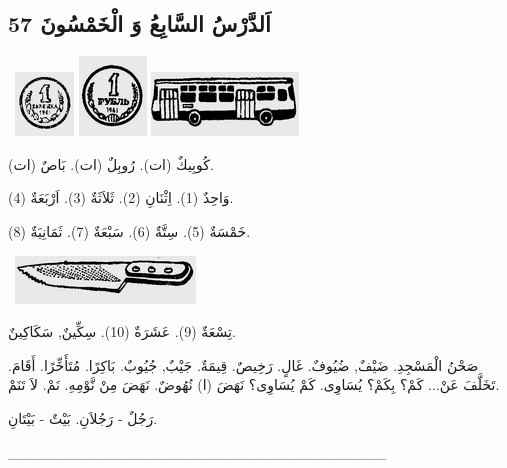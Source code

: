 \documentclass[a5paper]{article}
\begin{document}
\subsection{اَلدَّرْسُ السَّابِعُ وَ الْخَمْسُونَ 57 }
\  \includegraphics[width=0.6146in,height=0.6665in]{images/MuhammadBagauddinprettified-img186.png}   \includegraphics[width=0.7083in,height=0.8335in]{images/MuhammadBagauddinprettified-img187.png}   \includegraphics[width=1.5417in,height=0.6665in]{images/MuhammadBagauddinprettified-img188.png} 

كُوبِيكٌ (ات). رُوبِلٌ (ات). بَاصٌ (ات). 

وَاحِدٌ (1). اِثْنَانِ (2). ثَلاَثَةٌ (3). اَرْبَعَةٌ (4). 

خَمْسَةٌ (5). سِتَّةٌ (6). سَبْعَةٌ (7). ثَمَانِيَةٌ (8). 

\  \includegraphics[width=1.8854in,height=0.5in]{images/MuhammadBagauddinprettified-img189.png} 

تِسْعَةٌ (9). عَشَرَةٌ (10). سِكِّينٌ, سَكَاكِينٌ. 

صَحْنُ الْمَسْجِدِ. ضَيْفٌ, ضُيُوفٌ. غَالٍ. رَخِيصٌ. قِيمَةٌ. جَيْبٌ, جُيُوبٌ. بَاكِرًا. مُتَأَخِّرًا. أَقَامَ. تَخَلَّفَ عَنْ... كَمْ؟ بِكَمْ؟ يُسَاوِى. كَمْ يُسَاوِى؟ نَهَضَ (ا) نُهُوضٌ. نَهَضَ مِنْ نَّوْمِهِ. نَمْ. لاَ تَنَمْ. 

رَجُلٌ - رَجُلاَنِ. بَيْتٌ - بَيْتَانِ.

\_\_\_\_\_\_\_\_\_\_\_\_\_\_\_\_\_\_\_\_\_\_\_\_\_\_\_\_\_\_\_\_\_\_\_\_


\bigskip
\end{document}
